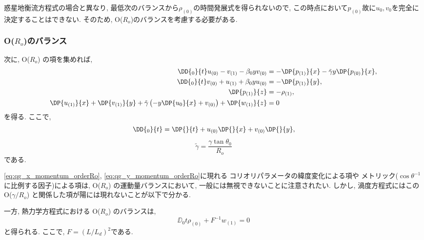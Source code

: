 惑星地衡流方程式の場合と異なり, 最低次のバランスから$\rho_{(0)}$の時間発展式を得られないので, 
この時点において$p_{(0)}$故に$u_0,v_0$を完全に決定することはできない. 
そのため, O($R_o$)のバランスを考慮する必要がある. 

\subsubsection*{O($R_o$)のバランス}

次に, O($R_o$) の項を集めれば, 
\begin{subequations} %
\begin{align}
  \DD{_0}{t} u_{(0)}  - v_{(1)}  - \beta_0 y v_{(0)}
     &= - \DP{p_{(1)}}{x} - \tilde{\gamma} y \DP{p_{(0)}}{x}, 
\label{eq:qg_x_momentum_orderRo} \\
  \DD{_0}{t} v_{(0)}  + u_{(1)}  + \beta_0 y u_{(0)}
     &= - \DP{p_{(1)}}{y}, 
\label{eq:qg_y_momentum_orderRo} \\
  \DP{p_{(1)}}{z} &= - \rho_{(1)},
\label{eq:gq_hydrostatic_orderRo} \\
  \DP{u_{(1)}}{x} + \DP{v_{(1)}}{y} 
     + \tilde{\gamma} \left(- y \DP{u_0}{x} + v_{(0)} \right) + \DP{w_{(1)}}{z} &= 0
\label{eq:qg_continious_orderRo}
\end{align}
\label{eq:qg_orderRo}
\end{subequations}
を得る. 
ここで, 
\begin{equation}
  \DD{_0}{t} = \DP{}{t} + u_{(0)} \DP{}{x} + v_{(0)} \DP{}{y}, 
\end{equation}
\begin{equation}
  \tilde{\gamma} = \dfrac{\gamma \tan\theta_0}{R_o}
\end{equation}
である. 

\eqref{eq:qg_x_momentum_orderRo}, \eqref{eq:qg_y_momentum_orderRo}に現れる
コリオリパラメータの緯度変化による項や 
メトリック($\cos{\theta}^{-1}$に比例する因子)による項は, 
O($R_o$) の運動量バランスにおいて, 一般には無視できないことに注意されたい. 
しかし, 渦度方程式にはこの O($\gamma/R_o$) と関係した項が陽には現れないことが以下で分かる. 

一方, 熱力学方程式における O($R_o$) のバランスは, 
\begin{equation}
  \DD{_0}{t} \rho_{(0)} + F^{-1} w_{(1)} = 0
\label{eq:gq_dens_order_Ro}
\end{equation}
と得られる. 
ここで, $F=(L/L_d)^2$である. 

 
